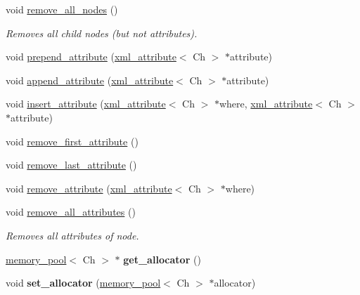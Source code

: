\begin{DoxyCompactItemize}
\mbox{\label{classrapidxml_1_1xml__node_a95735358b079ae0adcfbbac69aa1fbc3}} 
void \hyperlink{classrapidxml_1_1xml__node_a95735358b079ae0adcfbbac69aa1fbc3}{remove\+\_\+all\+\_\+nodes} ()
\begin{DoxyCompactList}\small\item\em Removes all child nodes (but not attributes). \end{DoxyCompactList}\item 
void \hyperlink{classrapidxml_1_1xml__node_a8b62ee76489faf8e2d1210869d547684}{prepend\+\_\+attribute} (\hyperlink{classrapidxml_1_1xml__attribute}{xml\+\_\+attribute}$<$ Ch $>$ $\ast$attribute)
\item 
void \hyperlink{classrapidxml_1_1xml__node_a33ce3386f8c42dd4db658b75cbb6e6c4}{append\+\_\+attribute} (\hyperlink{classrapidxml_1_1xml__attribute}{xml\+\_\+attribute}$<$ Ch $>$ $\ast$attribute)
\item 
void \hyperlink{classrapidxml_1_1xml__node_a9fe659cdf4a5b3bbf5e8ffc98db5a84f}{insert\+\_\+attribute} (\hyperlink{classrapidxml_1_1xml__attribute}{xml\+\_\+attribute}$<$ Ch $>$ $\ast$where, \hyperlink{classrapidxml_1_1xml__attribute}{xml\+\_\+attribute}$<$ Ch $>$ $\ast$attribute)
\item 
void \hyperlink{classrapidxml_1_1xml__node_aa95192d2a165cca16c551ed2a2a06aec}{remove\+\_\+first\+\_\+attribute} ()
\item 
void \hyperlink{classrapidxml_1_1xml__node_a1781a2cbedc9a51d609ad5b528125635}{remove\+\_\+last\+\_\+attribute} ()
\item 
void \hyperlink{classrapidxml_1_1xml__node_a6f97b1b4f46a94a4587915df3c0c6b57}{remove\+\_\+attribute} (\hyperlink{classrapidxml_1_1xml__attribute}{xml\+\_\+attribute}$<$ Ch $>$ $\ast$where)
\item 
\mbox{\label{classrapidxml_1_1xml__node_aa8d5d9484aa1eb5ff1841a073c84c1aa}} 
void \hyperlink{classrapidxml_1_1xml__node_aa8d5d9484aa1eb5ff1841a073c84c1aa}{remove\+\_\+all\+\_\+attributes} ()
\begin{DoxyCompactList}\small\item\em Removes all attributes of node. \end{DoxyCompactList}\item 
\mbox{\label{classrapidxml_1_1xml__node_a109c2ce9768071bb7e27bfaee3e94dc6}} 
\hyperlink{classrapidxml_1_1memory__pool}{memory\+\_\+pool}$<$ Ch $>$ $\ast$ {\bfseries get\+\_\+allocator} ()
\item 
\mbox{\label{classrapidxml_1_1xml__node_a67bf6428429a9749b0fcbf25c3f9ef40}} 
void {\bfseries set\+\_\+allocator} (\hyperlink{classrapidxml_1_1memory__pool}{memory\+\_\+pool}$<$ Ch $>$ $\ast$allocator)
\end{DoxyCompactItemize}
